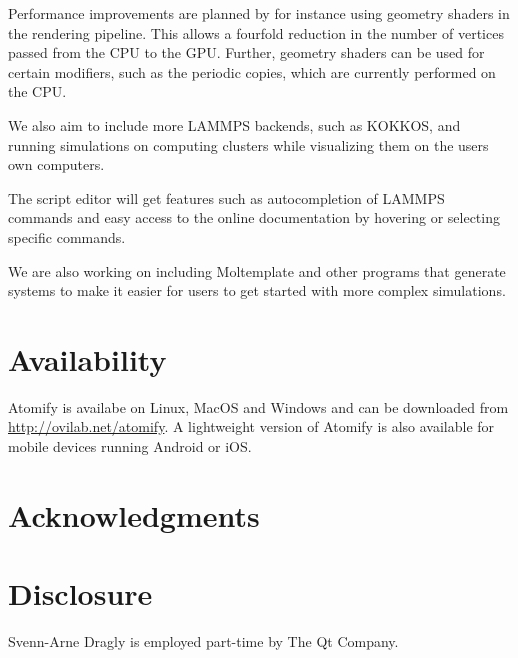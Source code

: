 \documentclass[aps,pre,twocolumn,letterpaper,floatfix,nofootinbib]{revtex4}
\begin{document}
Performance improvements are planned by for instance using geometry shaders in
the rendering pipeline.
This allows a fourfold reduction in the number of vertices passed from the CPU
to the GPU.
Further, geometry shaders can be used for certain modifiers,
such as the periodic copies, which are currently performed on the CPU.

We also aim to include more LAMMPS backends, such as KOKKOS, and running
simulations on computing clusters while visualizing them on the users own
computers.

The script editor will get features such as autocompletion of LAMMPS commands
and easy access to the online documentation by hovering or selecting specific
commands.

We are also working on including Moltemplate and other programs that generate
systems to make it easier for users to get started with more complex
simulations.

\section{Availability}

Atomify is availabe on Linux, MacOS and Windows and can be downloaded from
\href{https://ovilab.net/atomify}{http://ovilab.net/atomify}.
A lightweight version of Atomify is also available for mobile devices running
Android or iOS.

\section{Acknowledgments}

\section{Disclosure}

Svenn-Arne Dragly is employed part-time by The Qt Company.


\end{document}
